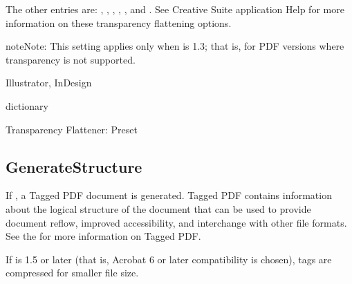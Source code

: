 \documentclass[letterpaper,12pt,english,openany,oneside]{sphinxmanual}
\begin{document}
The other entries are:  ,  ,  ,  ,  , and  . See Creative Suite application Help for more information on these transparency flattening options.

\begin{sphinxadmonition}{note}{Note:}
This setting applies only when  is 1.3; that is, for PDF versions where transparency is not supported.
\end{sphinxadmonition}
\label{\detokenize{PDF_Create_NewNamespaces:supported-by-10}}

Illustrator, InDesign

\label{\detokenize{PDF_Create_NewNamespaces:type-10}}

dictionary

\label{\detokenize{PDF_Create_NewNamespaces:ui-name-10}}

Transparency Flattener: Preset

\label{\detokenize{PDF_Create_NewNamespaces:default-value-9}}

\begin{sphinxVerbatim}[commandchars=\\\{\}]
 
\end{sphinxVerbatim}




\subsection{GenerateStructure}
\label{\detokenize{PDF_Create_NewNamespaces:generatestructure}}
If  , a Tagged PDF document is generated. Tagged PDF contains information about the logical structure of the document that can be used to provide document reflow, improved accessibility, and interchange with other file formats. See the  for more information on Tagged PDF.

If  is 1.5 or later (that is, Acrobat 6 or later compatibility is chosen), tags are compressed for smaller file size.
\end{document}
